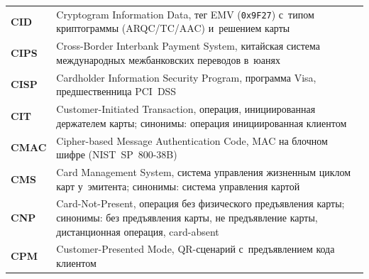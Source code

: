 \begin{longtable}{@{}p{4.5em}p{\dimexpr\linewidth-4.5em-2\tabcolsep\relax}@{}}
  \textbf{CID}               & Cryptogram Information Data, тег EMV (\texttt{0x9F27}) с~типом криптограммы (ARQC/TC/AAC) и~решением карты                                                                                                                                                                                        \\
  \textbf{CIPS}              & Cross-Border Interbank Payment System, китайская система международных межбанковских переводов в~юанях                                                                                                                                                                                           \\
  \textbf{CISP}              & Cardholder Information Security Program, программа Visa, предшественница PCI~DSS                                                                                                                                                                                                                 \\
  \textbf{CIT}               & Customer-Initiated Transaction, операция, инициированная держателем карты; синонимы: операция инициированная клиентом                                                                                                                                                                            \\
  \textbf{CMAC}              & Cipher-based Message Authentication Code, MAC на блочном шифре (NIST~SP~800-38B)                                                                                                                                                                                                                 \\
  \textbf{CMS}               & Card Management System, система управления жизненным циклом карт у~эмитента; синонимы: система управления картой                                                                                                                                                                                 \\
  \textbf{CNP}               & Card-Not-Present, операция без физического предъявления карты; синонимы: без предъявления карты, не предъявление карты, дистанционная операция, card-absent                                                                                                                                      \\
  \textbf{CPM}               & Customer-Presented Mode, QR-сценарий с~предъявлением кода клиентом                                                                                                                                                                                                                               \\

\end{longtable}
